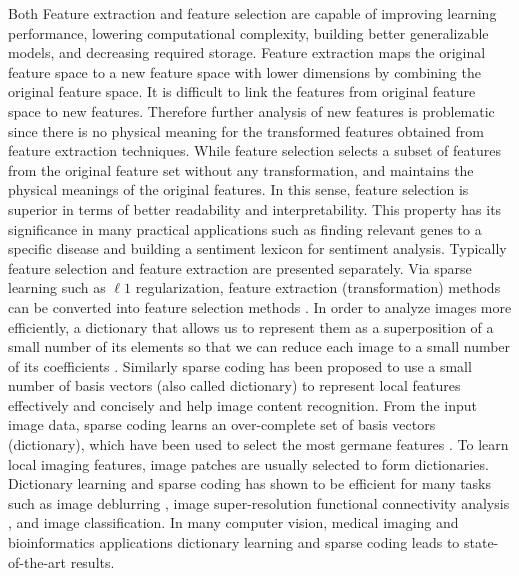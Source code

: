 \documentclass[authoryear,preprint,revi	ew,12pt]{elsarticle}
\begin{document}
Both Feature extraction and feature selection are capable of improving learning performance, lowering computational complexity, building better generalizable models, and decreasing required storage. Feature extraction maps the original feature space to a new feature space with lower dimensions by combining the original feature space. It is difficult to link the features from original feature space to new features. Therefore further analysis of new features is problematic since there is no physical meaning for the transformed features obtained from feature extraction techniques. While feature selection selects a subset of features from the original feature set without any transformation, and maintains the physical meanings of the original features. In this sense, feature selection is superior in terms of better readability and interpretability. This property has its significance in many practical applications such as finding relevant genes to a specific disease and building a sentiment lexicon for sentiment analysis. Typically feature selection and feature extraction are presented separately. Via sparse learning such as $\ell1$ regularization, feature extraction (transformation) methods can be converted into feature selection methods \citep{masaeli2010transformation}. In order to analyze images more efficiently, a dictionary that allows us to represent them as a superposition of a small number of its elements so that we can reduce each image to a small number of its coefficients \citep{schnass2008dictionary}. Similarly sparse coding \citep{lin2014stochastic} has been proposed to use a small number of basis vectors (also called dictionary) to represent local features effectively and concisely and help image content recognition. From the input image data, sparse coding learns an over-complete set of basis vectors (dictionary), which have been used to select the most germane features \citep*{friedman2001elements}. To learn local imaging features, image patches are usually selected to form dictionaries. Dictionary learning and sparse coding \citep{mairal2009online} has shown to be efficient for many tasks such as image deblurring \citep{yin2008bregman}, image super-resolution functional connectivity analysis \citep{lv2015holistic,lv2015modeling}, and image classification. In many computer vision, medical imaging and bioinformatics applications \citep{mairal2009online,moody2012unsupervised,lv2015modeling} dictionary learning and sparse coding leads to state-of-the-art results.
\end{document}
